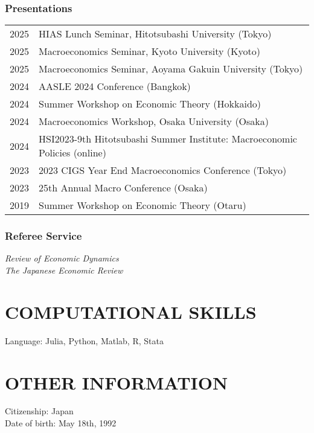 \documentclass[12pt]{article}
\begin{document}
\subsubsection*{Presentations}
\begin{tabular}{@{}ll}
2025&HIAS Lunch Seminar, Hitotsubashi University (Tokyo)\\
2025&Macroeconomics Seminar, Kyoto University (Kyoto)\\
2025&Macroeconomics Seminar, Aoyama Gakuin University (Tokyo)\\
2024&AASLE 2024 Conference (Bangkok)\\
2024&Summer Workshop on Economic Theory (Hokkaido)\\
2024&Macroeconomics Workshop, Osaka University (Osaka)\\
2024&HSI2023-9th Hitotsubashi Summer Institute: Macroeconomic Policies (online)\\
2023&2023 CIGS Year End Macroeconomics Conference (Tokyo)\\
2023&25th Annual Macro Conference (Osaka)\\
2019&Summer Workshop on Economic Theory (Otaru)
\end{tabular}
\subsubsection*{Referee Service}
\textit{Review of Economic Dynamics}\\
\textit{The Japanese Economic Review}

\section*{COMPUTATIONAL SKILLS}
Language: Julia, Python, Matlab, R, Stata

\section*{OTHER INFORMATION}
Citizenship: Japan\\
Date of birth: May 18th, 1992
\end{document}
